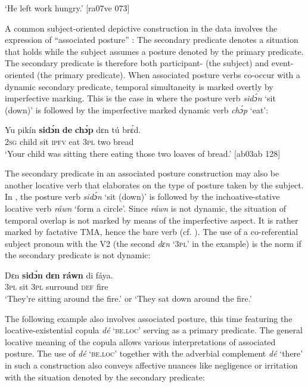 \glt ‘He left work hungry.’ [ra07ve 073]
\z

A common subject-oriented depictive construction in the data involves the expression of “associated posture” \citep{Enfield2002}: The secondary predicate denotes a situation that holds while the subject assumes a posture denoted by the primary predicate. The secondary predicate is therefore both participant- (the subject) and event-oriented (the primary predicate). When associated posture verbs co-occur with a dynamic secondary predicate, temporal simultaneity is marked overtly by imperfective marking. This is the case in  where the posture verb \textit{sidɔ́n} ‘sit (down)’ is followed by the imperfective marked dynamic verb \textit{chɔ́p} ‘eat’: 


\ea%
    \label{ex:key:1596}
    \gll Yu  pikín  \textbf{sidɔ́n}  \textbf{de}  \textbf{chɔ́p}  dɛn  tú  brɛ́d.\\
\textsc{2sg}  child  sit    \textsc{ipfv}  eat    \textsc{3pl}  two  bread\\

\glt ‘Your child was sitting there eating those two loaves of bread.’ [ab03ab 128]
\z

The secondary predicate in an associated posture construction may also be another locative verb that elaborates on the type of posture taken by the subject. In , the posture verb \textit{sidɔ́n} ‘sit (down)’ is followed by the inchoative-stative locative verb \textit{ráwn} ‘form a circle’. Since \textit{ráwn} is not dynamic, the situation of temporal overlap is not marked by means of the imperfective aspect. It is rather marked by factative TMA, hence the bare verb (cf. ). The use of a co-referential subject pronoun with the V2 (the second \textit{dɛn} ‘\textsc{3pl’} in the example) is the norm if the secondary predicate is not dynamic:


\ea%
    \label{ex:key:1597}
\gll
        Dɛn    \textbf{sidɔ́n}  \textbf{dɛn}    \textbf{ráwn}    di  fáya.\\
\textsc{3pl}    sit    \textsc{3pl}    surround  \textsc{def}  fire\\

\glt ‘They’re sitting around the fire.’ or ‘They sat down around the fire.’\textstylePichiglossZchn{ [ro05ee 115]}
\z

The following example also involves associated posture, this time featuring the locative-existential copula \textit{dé} \textsc{‘be.loc’} serving as a primary predicate. The general locative meaning of the copula allows various interpretations of associated posture. The use of \textit{dé} \textsc{‘be.loc’} together with the adverbial complement \textit{dé} ‘there’ in such a construction also conveys affective nuances like negligence or irritation with the situation denoted by the secondary predicate:


